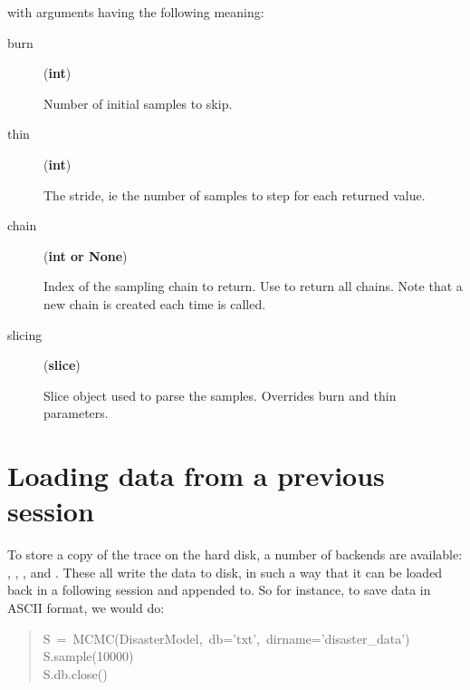 with arguments having the following meaning:
\begin{description}
\item[{burn}] (\textbf{int})

Number of initial samples to skip.

\item[{thin}] (\textbf{int})

The stride, ie the number of samples to step for each returned value.

\item[{chain}] (\textbf{int or None})

Index of the sampling chain to return. Use  to return all chains. Note that a new chain is created each time  is called.

\item[{slicing}] (\textbf{slice})

Slice object used to parse the samples. Overrides burn and thin parameters.

\end{description}



\hypertarget{loading-data-from-a-previous-session}{}
\section*{Loading data from a previous session}

To store a copy of the trace on the hard disk, a number of backends are available: , , ,  and . These all write the data to disk, in such a way that it can be loaded back in a following session and appended to. So for instance, to save data in ASCII format, we would do:
\begin{quote}{\ttfamily \raggedright \noindent
S~=~MCMC(DisasterModel,~db='txt',~dirname='disaster{\_}data')~\\
S.sample(10000)~\\
S.db.close()
}\end{quote}

